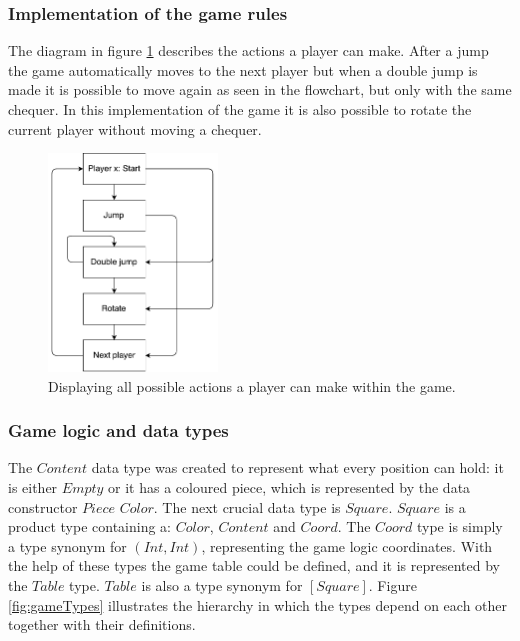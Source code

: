 \documentclass[a4paper]{article}
\begin{document}
\subsubsection{Implementation of the game rules}
\label{sec:game-rules}
The diagram in figure \ref{fig:flowchartGame} describes the actions a player can make. After a jump the game automatically moves to the next player but when a double jump is made it is possible to move again as seen in the flowchart, but only with the same chequer. In this implementation of the game it is also possible to rotate the current player without moving a chequer. 
\begin{figure}[h!]
    \centering
    \includegraphics[scale=0.1,width=0.4\textwidth]{figure/flowchartGame}
    \caption{Displaying all possible actions a player can make within the game.}
    \label{fig:flowchartGame}
\end{figure}

\subsubsection{Game logic and data types}


The $Content$ data type was created to represent what every position can hold: it is either $Empty$ or it has a coloured piece, which is represented by the data constructor $Piece$ $Color$. The next crucial data type is $Square$. $Square$ is a product type containing a: $Color$, $Content$ and $Coord$. The $Coord$ type is simply a type synonym for $(Int,Int)$, representing the game logic coordinates. With the help of these types the game table could be defined, and it is represented by the $Table$ type. $Table$ is also a type synonym for $[Square]$. Figure \ref{fig:gameTypes} illustrates the hierarchy in which the types depend on each other together with their definitions.
\end{document}
